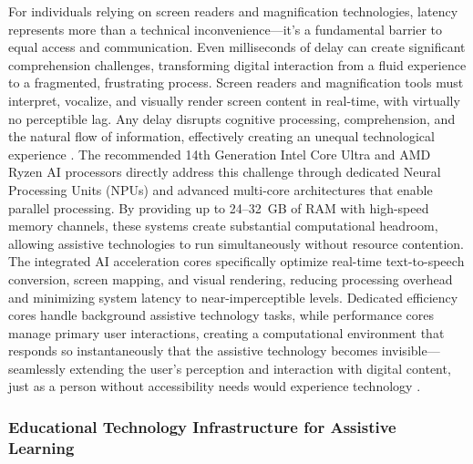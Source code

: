 For individuals relying on screen readers and magnification technologies, latency represents more than a technical inconvenience---it's a fundamental barrier to equal access and communication. Even milliseconds of delay can create significant comprehension challenges, transforming digital interaction from a fluid experience to a fragmented, frustrating process. Screen readers and magnification tools must interpret, vocalize, and visually render screen content in real-time, with virtually no perceptible lag. Any delay disrupts cognitive processing, comprehension, and the natural flow of information, effectively creating an unequal technological experience \supercite{Fowler2011ScreenReaderLatency, Nielsen1993UsabilityEngineering}. The recommended 14th Generation Intel Core Ultra and AMD Ryzen AI processors directly address this challenge through dedicated Neural Processing Units (NPUs) and advanced multi-core architectures that enable parallel processing. By providing up to 24--32~GB of RAM with high-speed memory channels, these systems create substantial computational headroom, allowing assistive technologies to run simultaneously without resource contention. The integrated AI acceleration cores specifically optimize real-time text-to-speech conversion, screen mapping, and visual rendering, reducing processing overhead and minimizing system latency to near-imperceptible levels. Dedicated efficiency cores handle background assistive technology tasks, while performance cores manage primary user interactions, creating a computational environment that responds so instantaneously that the assistive technology becomes invisible---seamlessly extending the user's perception and interaction with digital content, just as a person without accessibility needs would experience technology \supercite{AIinAccessibility, EducationalEquityReport2024}.


\subsubsection{Educational Technology Infrastructure for Assistive Learning}

